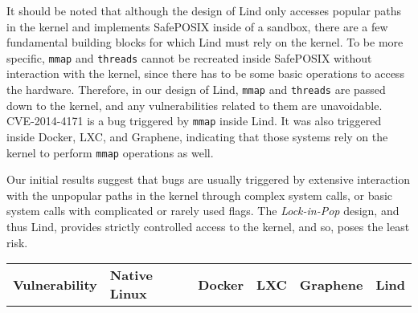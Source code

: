 {{{It should be noted that although the design of Lind only accesses popular paths in the kernel and implements SafePOSIX inside
of a sandbox, there are a few fundamental building blocks for which Lind must rely on the kernel. To be more specific,
\texttt{mmap} and \texttt{threads} cannot be recreated inside SafePOSIX without interaction with the kernel, since there has
to be some basic operations to access the hardware. Therefore, in our design of Lind, \texttt{mmap} and \texttt{threads}
are passed down to the kernel, and any vulnerabilities related to them are  unavoidable.
CVE-2014-4171 is a bug triggered by \texttt{mmap} inside Lind. It was also triggered inside Docker, LXC, and Graphene, indicating
that those systems rely on the kernel to perform \texttt{mmap} operations as well.

Our initial results suggest that bugs are usually triggered by extensive interaction with the unpopular paths in the kernel through
complex system calls, or basic system calls
with complicated or rarely used flags. The \emph{Lock-in-Pop} design, and thus Lind,
provides strictly controlled access to the kernel, and so, poses
the least risk.



\begin{table}[h]
\scriptsize
\centering

\begin{tabular}{|p{1.7cm}|p{.6cm}|p{.65cm}|p{.65cm}|p{.9cm}|p{.6cm}|}\hline

\multirow{2}{1.7cm}{\bf Vulnerability}    &  \multirow{2}{.6cm}{\bf Native Linux}
 & \multirow{2}{.6cm}{\bf Docker} & \multirow{2}{.6cm}{\bf LXC} &
\multirow{2}{1cm}{\bf Graphene} & \multirow{2}{.6cm}{\bf Lind} \\
& & & & & \\
\hline


\end{tabular}
\end{table}}}}
